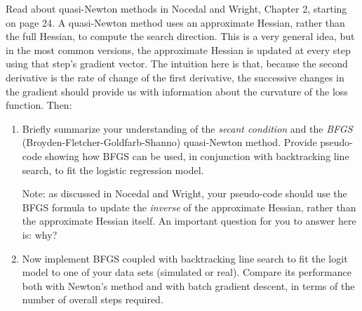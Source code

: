 \documentclass[11 pt]{article}
\begin{document}
Read about quasi-Newton methods in Nocedal and Wright, Chapter 2, starting on page 24.  A quasi-Newton method uses an approximate Hessian, rather than the full Hessian, to compute the search direction.   This is a very general idea, but in the most common versions, the approximate Hessian is updated at every step using that step's gradient vector.  The intuition here is that, because the second derivative is the rate of change of the first derivative, the successive changes in the gradient should provide us with information about the curvature of the loss function.  Then:

\begin{enumerate}[label=(\Alph*)]
	\item Briefly summarize your understanding of the \textit{secant condition} and the \textit{BFGS} (Broyden-Fletcher-Goldfarb-Shanno) quasi-Newton method.  Provide pseudo-code showing how BFGS can be used, in conjunction with backtracking line search, to fit the logistic regression model.
	
	Note: as discussed in Nocedal and Wright, your pseudo-code should use the BFGS formula to update the \textit{inverse} of the approximate Hessian, rather than the approximate Hessian itself.  An important question for you to answer here is: why?
	\item Now implement BFGS coupled with backtracking line search to fit the logit model to one of your data sets (simulated or real).  Compare its performance both with Newton's method and with batch gradient descent, in terms of the number of overall steps required.
\end{enumerate}
\end{document}
